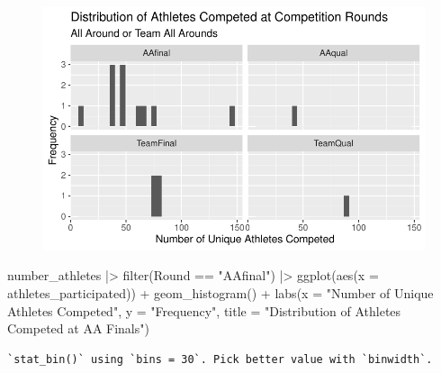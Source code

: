 \documentclass[
  letterpaper,
  DIV=11,
  numbers=noendperiod]{scrartcl}
\newenvironment{Shaded}{\begin{snugshade}}{\end{snugshade}}
\newcommand{\AttributeTok}[1]{\textcolor[rgb]{0.40,0.45,0.13}{#1}}
\newcommand{\FunctionTok}[1]{\textcolor[rgb]{0.28,0.35,0.67}{#1}}
\newcommand{\NormalTok}[1]{\textcolor[rgb]{0.00,0.23,0.31}{#1}}
\newcommand{\SpecialCharTok}[1]{\textcolor[rgb]{0.37,0.37,0.37}{#1}}
\newcommand{\StringTok}[1]{\textcolor[rgb]{0.13,0.47,0.30}{#1}}
\begin{document}
\begin{figure}[H]

{\centering \includegraphics{Main_files/figure-pdf/unnamed-chunk-6-1.pdf}

}

\end{figure}

\begin{Shaded}
\begin{Highlighting}[]
\NormalTok{number\_athletes }\SpecialCharTok{|\textgreater{}}
  \FunctionTok{filter}\NormalTok{(Round }\SpecialCharTok{==} \StringTok{"AAfinal"}\NormalTok{) }\SpecialCharTok{|\textgreater{}}
  \FunctionTok{ggplot}\NormalTok{(}\FunctionTok{aes}\NormalTok{(}\AttributeTok{x =}\NormalTok{ athletes\_participated)) }\SpecialCharTok{+}
    \FunctionTok{geom\_histogram}\NormalTok{() }\SpecialCharTok{+}
    \FunctionTok{labs}\NormalTok{(}\AttributeTok{x =} \StringTok{"Number of Unique Athletes Competed"}\NormalTok{,}
         \AttributeTok{y =} \StringTok{"Frequency"}\NormalTok{,}
         \AttributeTok{title =} \StringTok{"Distribution of Athletes Competed at AA Finals"}\NormalTok{)}
\end{Highlighting}
\end{Shaded}

\begin{verbatim}
`stat_bin()` using `bins = 30`. Pick better value with `binwidth`.
\end{verbatim}
\end{document}
